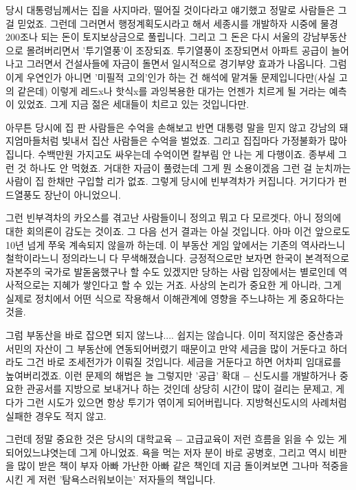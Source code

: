 당시 대통령님께서는 집을 사지마라, 떨어질 것이다라고 얘기했고 정말로 사람들은 그걸 믿었죠.
그런데 그러면서 행정계획도시라고 해서 세종시를 개발하자 시중에 물경 200조나 되는 돈이 토지보상금으로 풀립니다.
그리고 그 돈은 다시 서울의 강남부동산으로 몰려버리면서 '투기열풍'이 조장되죠.
투기열풍이 조장되면서 아파트 공급이 늘어나고 그러면서 건설사들에 자금이 돌면서 일시적으로 경기부양 효과가 나옵니다.
그럼 이게 우연인가 아니면 '미필적 고의'인가 하는 건 해석에 맡겨둘 문제입니다만(사실 고의 같은데)
이렇게 레드x나 핫식x를 과잉복용한 대가는 언젠가 치르게 될 거라는 예측이 있었죠. 그게 지금 젊은 세대들이 치르고 있는 것입니다만.
\vspace{5mm}

아무튼 당시에 집 판 사람들은 수억을 손해보고
반면 대통령 말을 믿지 않고 강남의 돼지엄마들처럼 빚내서 집산 사람들은 수억을 벌었죠.
그리고 집집마다 가정불화가 많아집니다. 수백만원 가지고도 싸우는데 수억이면 칼부림 안 나는 게 다행이죠.
종부세 그런 것 하나도 안 먹혔죠. 거대한 자금이 풀렸는데 그게 뭔 소용이겠음
그런 걸 눈치까는 사람이 집 한채만 구입할 리가 없죠. 그렇게 당시에 빈부격차가 커집니다.
거기다가 펀드열풍도 장난이 아니었으니.
\vspace{5mm}

그런 빈부격차의 카오스를 겪고난 사람들이니 정의고 뭐고 다 모르겟다, 아니 정의에 대한 회의론이 감도는 것이죠.
그 다음 선거 결과는 아실 것입니다. 아마 이건 앞으로도 10년 넘게 쭈욱 계속되지 않을까 하는데.
이 부동산 게임 앞에서는 기존의 역사라느니 철학이라느니 정의라느니 다 무색해졌습니다.
긍정적으로만 보자면 한국이 본격적으로 자본주의 국가로 발돋움했구나 할 수도 있겠지만 당하는 사람 입장에서는 별로인데
역사적으로는 지혜가 쌓인다고 할 수 있는 거죠.
사상의 논리가 중요한 게 아니라, 그게 실제로 정치에서 어떤 식으로 작용해서 이해관계에 영향을 주느냐하는 게 중요하다는 것을.
\vspace{5mm}

그럼 부동산을 바로 잡으면 되지 않느냐.... 쉽지는 않습니다.
이미 적지않은 중산층과 서민의 자산이 그 부동산에 연동되어버렸기 때문이고
만약 세금을 많이 거둔다고 하더라도 그건 바로 조세전가가 이뤄질 것입니다.
세금을 거둔다고 하면 어차피 임대료를 높여버리겠죠.
이런 문제의 해법은 늘 그렇지만 '공급' 확대 $-$ 신도시를 개발하거나 중요한 관공서를 지방으로 보내거나 하는 것인데
상당히 시간이 많이 걸리는 문제고, 게다가 그런 시도가 있으면 항상 투기가 엮이게 되어버립니다.
지방혁신도시의 사례처럼 실패한 경우도 적지 않고.
\vspace{5mm}

그런데 정말 중요한 것은
당시의 대학교육 $-$ 고급교육이 저런 흐름을 읽을 수 있는 게 되어있느냐엿는데 그게 아니었죠.
욕을 먹는 저자 분이 바로 공병호, 그리고 역시 비판을 많이 받은 책이 부자 아빠 가난한 아빠 같은 책인데
지금 돌이켜보면 그나마 적중을 시킨 게 저런 '탐욕스러워보이는' 저자들의 책입니다.
\vspace{5mm}

